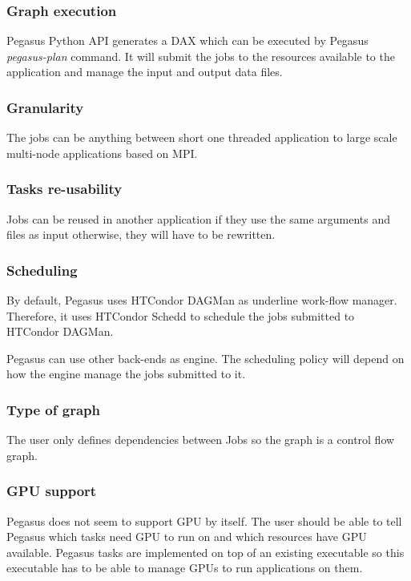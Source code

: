\subsubsection{Graph execution}
Pegasus Python API generates a DAX which can be executed by Pegasus \textit{pegasus-plan} command.
It will submit the jobs to the resources available to the application and manage the input and output data files.

\subsubsection{Granularity}
The jobs can be anything between short one threaded application to large scale multi-node applications based on MPI.

\subsubsection{Tasks re-usability}
Jobs can be reused in another application if they use the same arguments and files as input otherwise, they will have to be rewritten.


\subsubsection{Scheduling}
By default, Pegasus uses HTCondor DAGMan \cite{ThaTL2002} as underline work-flow manager.
Therefore, it uses HTCondor Schedd to schedule the jobs submitted to HTCondor DAGMan.

Pegasus can use  other back-ends as engine.
The scheduling policy will depend on how the engine manage the jobs submitted to it.


\subsubsection{Type of graph}
The user only defines dependencies between Jobs so the graph is a control flow graph.

\subsubsection{GPU support}
Pegasus does not seem to support GPU by itself.
The user should be able to tell Pegasus which tasks need GPU to run on and which resources have GPU available.
Pegasus tasks are implemented on top of an existing executable so this executable has to be able to manage GPUs to run applications on them.



